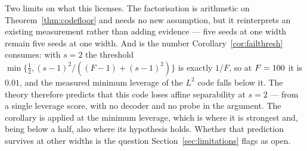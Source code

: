 Two limits on what this licenses. The factorisation is arithmetic on
Theorem~\ref{thm:codefloor} and needs no new assumption, but it reinterprets an existing
measurement rather than adding evidence --- five seeds at one width remain five seeds at one
width. And \GoneLtwoLeverageMin{} is the number Corollary~\ref{cor:failthresh} consumes: with
$s=2$ the threshold $\min\{\tfrac12,(s-1)^2/((F-1)+(s-1)^2)\}$ is exactly $1/F$, so at
$F=100$ it is $0.01$, and the measured minimum leverage of the $L^2$ code falls below it. The
theory therefore predicts that this code loses affine separability at $s=2$ --- from a single
leverage score, with no decoder and no probe in the argument. The corollary is applied at the
minimum leverage, which is where it is strongest and, being below a half, also where its
hypothesis holds. Whether that prediction survives at other widths is the
question Section~\ref{sec:limitations} flags as open.

